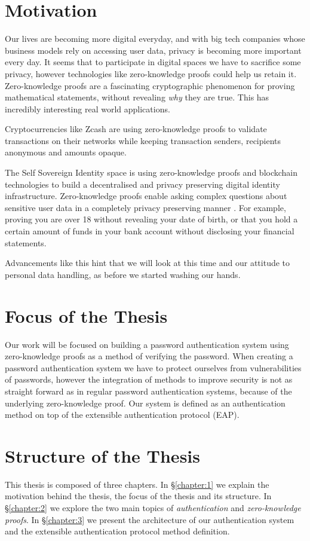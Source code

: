 \label{chapter:1}

\section{Motivation}
Our lives are becoming more digital everyday, and with big tech companies whose business models rely on accessing user data, privacy is becoming more important every day.
It seems that to participate in digital spaces we have to sacrifice some privacy, however technologies like zero-knowledge proofs could help us retain it.
Zero-knowledge proofs are a fascinating cryptographic phenomenon for proving mathematical statements, without revealing \textit{why} they are true. 
This has incredibly interesting real world applications.

Cryptocurrencies like Zcash \cite{hopwood2016zcash} are using zero-knowledge proofs to validate transactions on their networks while keeping transaction senders, recipients anonymous and amounts opaque.

The Self Sovereign Identity space is using zero-knowledge proofs and blockchain technologies to build a decentralised and privacy preserving digital identity infrastructure.
Zero-knowledge proofs enable asking complex questions about sensitive user data in a completely privacy preserving manner \cite{10.1007/978-3-540-89255-7_15}.
For example, proving you are over 18 without revealing your date of birth, or that you hold a certain amount of funds in your bank account without disclosing your financial statements.

Advancements like this hint that we will look at this time and our attitude to personal data handling, as before we started washing our hands.
\bigskip

\section{Focus of the Thesis}
Our work will be focused on building a password authentication system using zero-knowledge proofs as a method of verifying the password.
When creating a password authentication system we have to protect ourselves from vulnerabilities of passwords, however the integration of methods to improve security is not as straight forward as in regular password authentication systems, because of the underlying zero-knowledge proof.
Our system is defined as an authentication method on top of the extensible authentication protocol (EAP).

\section{Structure of the Thesis}
This thesis is composed of three chapters.
In \S\ref{chapter:1} we explain the motivation behind the thesis, the focus of the thesis and its structure.
In \S\ref{chapter:2} we explore the two main topics of \textit{authentication} and \textit{zero-knowledge proofs}.
In \S\ref{chapter:3} we present the architecture of our authentication system and the extensible authentication protocol method definition.

